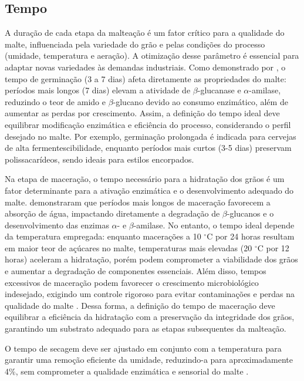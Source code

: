 \subsection{Tempo}
A duração de cada etapa da malteação é um fator crítico para a qualidade do malte, influenciada pela variedade do grão e pelas condições do processo (umidade, temperatura e aeração). A otimização desse parâmetro é essencial para adaptar novas variedades às demandas industriais. Como demonstrado por , o tempo de germinação (3 a 7 dias) afeta diretamente as propriedades do malte: períodos mais longos (7 dias) elevam a atividade de $\beta$-glucanase e $\alpha$-amilase, reduzindo o teor de amido e $\beta$-glucano devido ao consumo enzimático, além de aumentar as perdas por crescimento. Assim, a definição do tempo ideal deve equilibrar modificação enzimática e eficiência do processo, considerando o perfil desejado no malte. Por exemplo, germinação prolongada é indicada para cervejas de alta fermentescibilidade, enquanto períodos mais curtos (3-5 dias) preservam polissacarídeos, sendo ideais para estilos encorpados.

Na etapa de maceração, o tempo necessário para a hidratação dos grãos é um fator determinante para a ativação enzimática e o desenvolvimento adequado do malte.  demonstraram que períodos mais longos de maceração favorecem a absorção de água, impactando diretamente a degradação de $\beta$-glucanos e o desenvolvimento das enzimas $\alpha$- e $\beta$-amilase. No entanto, o tempo ideal depende da temperatura empregada: enquanto macerações a 10 $^{\circ}$C por 24 horas resultam em maior teor de açúcares no malte, temperaturas mais elevadas (20 $^{\circ}$C por 12 horas) aceleram a hidratação, porém podem comprometer a viabilidade dos grãos e aumentar a degradação de componentes essenciais. Além disso, tempos excessivos de maceração podem favorecer o crescimento microbiológico indesejado, exigindo um controle rigoroso para evitar contaminações e perdas na qualidade do malte \cite{LUARASI2016}. Dessa forma, a definição do tempo de maceração deve equilibrar a eficiência da hidratação com a preservação da integridade dos grãos, garantindo um substrato adequado para as etapas subsequentes da malteação.

O tempo de secagem deve ser ajustado em conjunto com a temperatura para garantir uma remoção eficiente da umidade, reduzindo-a para aproximadamente 4\%, sem comprometer a qualidade enzimática e sensorial do malte \cite{LEWIS2012}.